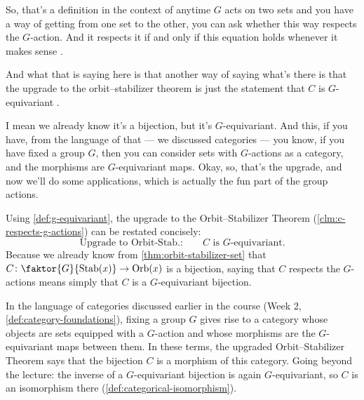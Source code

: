 \begin{speech}[00:23:08 - 00:24:22]
So, that's a definition in the context of anytime $G$ acts on two sets and you have a way of getting from one set to the other, you can ask whether this way respects the $G$-action. And it respects it if and only if this equation holds whenever it makes sense .

And what that is saying here is that another way of saying what's there  is that the upgrade to the orbit--stabilizer theorem is just the statement that $C$ is $G$-equivariant .

I mean we already know it's a bijection, but it's $G$-equivariant. And this, if you have, from the language of that --- we discussed categories --- you know, if you have fixed a group $G$, then you can consider sets with $G$-actions as a category, and the morphisms are $G$-equivariant maps. Okay, so, that's the upgrade, and now we'll do some applications, which is actually the fun part of the group actions.
\end{speech}

\begin{content}
Using \cref{def:g-equivariant}, the upgrade to the Orbit--Stabilizer Theorem (\cref{clm:c-respects-g-actions}) can be restated concisely:
\[
\text{Upgrade to Orbit-Stab.:} \qquad \boxed{C \text{ is } G\text{-equivariant}.}
\]
Because we already know from \cref{thm:orbit-stabilizer-set} that $C \colon \faktor{G}{\operatorname{Stab}(x)} \to \operatorname{Orb}(x)$ is a bijection, saying that $C$ respects the $G$-actions means simply that $C$ is a $G$-equivariant bijection.
\end{content}

\begin{insight}
In the language of categories discussed earlier in the course (Week 2, \cref{def:category-foundations}), fixing a group $G$ gives rise to a category whose objects are sets equipped with a $G$-action and whose morphisms are the $G$-equivariant maps between them. In these terms, the upgraded Orbit--Stabilizer Theorem says that the bijection $C$ is a morphism of this category. Going beyond the lecture: the inverse of a $G$-equivariant bijection is again $G$-equivariant, so $C$ is an isomorphism there (\cref{def:categorical-isomorphism}).
\end{insight}

